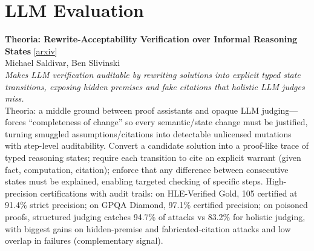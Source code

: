 \documentclass[12pt,letterpaper]{article}
\begin{document}
\medskip


\section*{LLM Evaluation}

{\small\textbf{Theoria: Rewrite-Acceptability Verification over Informal Reasoning States}} {\scriptsize[\href{https://arxiv.org/abs/2607.01223}{arxiv}]}\\
{\scriptsize Michael Saldivar, Ben Slivinski}\\

{\small\textit{Makes LLM verification auditable by rewriting solutions into explicit typed state transitions, exposing hidden premises and fake citations that holistic LLM judges miss.}}\\[1pt]
{\footnotesize Theoria: a middle ground between proof assistants and opaque LLM judging---forces ``completeness of change'' so every semantic/state change must be justified, turning smuggled assumptions/citations into detectable unlicensed mutations with step-level auditability. Convert a candidate solution into a proof-like trace of typed reasoning states; require each transition to cite an explicit warrant (given fact, computation, citation); enforce that any difference between consecutive states must be explained, enabling targeted checking of specific steps. High-precision certifications with audit trails: on HLE-Verified Gold, 105 certified at 91.4\% strict precision; on GPQA Diamond, 97.1\% certified precision; on poisoned proofs, structured judging catches 94.7\% of attacks vs 83.2\% for holistic judging, with biggest gains on hidden-premise and fabricated-citation attacks and low overlap in failures (complementary signal).}

\medskip
\end{document}
